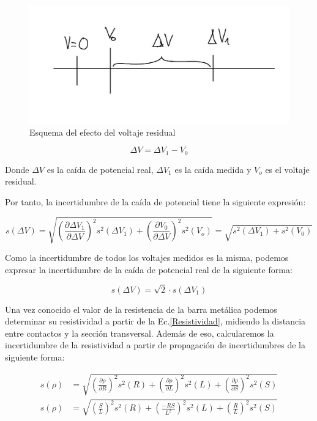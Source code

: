 \documentclass[a4paper,12pt,titlepage]{report}
\begin{document}
\begin{figure}[h!]
    \centering
    \includegraphics[width=0.65\linewidth]{Images/voltaje residual-4 (002).jpg}
    \caption{Esquema del efecto del voltaje residual}
\end{figure}

\begin{equation}
    \Delta V = \Delta V_{1} - V_{0}
    \label{Voltaje residual}
\end{equation}

Donde $\Delta V$ es la caída de potencial real, $\Delta V_{1}$ es la caída medida y $V_{o}$ es el voltaje residual.

Por tanto, la incertidumbre de la caída de potencial tiene la siguiente expresión:

\begin{equation}
    s(\Delta V) = \sqrt{\left (\frac{\partial \Delta V_{1}}{\partial \Delta V}\right )^2s^2(\Delta V_{1}) + \left (\frac{\partial V_{0}}{\partial \Delta V}\right )^2s^2(V_{o})} = \sqrt{s^2(\Delta V_{1}) + s^2(V_{0})}
    \label{Inc Voltaje residual}
\end{equation}

Como la incertidumbre de todos los voltajes medidos es la misma, podemos expresar la incertidumbre de la caída de potencial real de la siguiente forma:

\begin{equation}
    s(\Delta V) = \sqrt{2}\cdot s(\Delta V_{1})
    \label{Inc voltaje}
\end{equation}

\newpage

\par Una vez conocido el valor de la resistencia de la barra metálica podemos determinar su resistividad a partir de la Ec.\ref{Resistividad}, midiendo la distancia entre contactos y la sección transversal. Además de eso, calcularemos la incertidumbre de la resistividad a partir de propagación de incertidumbres de la siguiente forma:

\begin{align}
    s(\rho) &= \sqrt{\left (\frac{\partial \rho}{\partial R}\right )^2s^2(R)  +  \left (\frac{\partial \rho}{\partial L}\right )^2s^2(L)  +  \left (\frac{\partial \rho}{\partial S}\right )^2s^2(S)} \nonumber \\
    s(\rho) &= \sqrt{\left (\frac{S}{L}\right )^2s^2(R)  +  \left (\frac{-RS}{L^2}\right )^2s^2(L)  +  \left (\frac{R}{L}\right )^2s^2(S)}
    \label{Inc resistividad}
\end{align}
\end{document}
